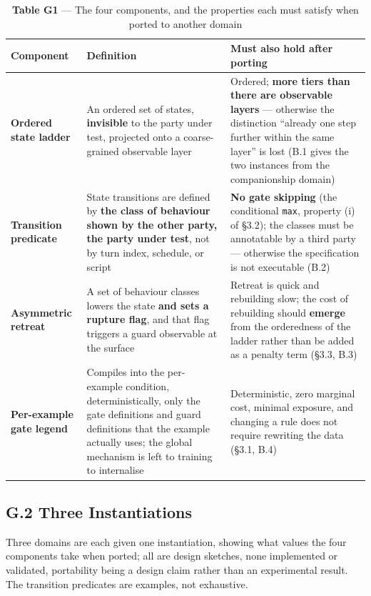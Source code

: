 \documentclass[letterpaper]{article}
\begin{document}
\begin{table}[t]
\centering\footnotesize
\setlength{\tabcolsep}{4pt}
\caption{\textbf{Table G1} --- The four components, and the properties each must satisfy when ported to another domain}
\begin{tabular}{@{}>{\raggedright\arraybackslash}p{}>{\raggedright\arraybackslash}p{}>{\raggedright\arraybackslash}p{}@{}}
\toprule
Component & Definition & Must also hold after porting \\
\midrule
\textbf{Ordered state ladder} & An ordered set of states, \textbf{invisible} to the party under test, projected onto a coarse-grained observable layer & Ordered; \textbf{more tiers than there are observable layers} --- otherwise the distinction ``already one step further within the same layer'' is lost (B.1 gives the two instances from the companionship domain) \\
\textbf{Transition predicate} & State transitions are defined by \textbf{the class of behaviour shown by the other party, the party under test}, not by turn index, schedule, or script & \textbf{No gate skipping} (the conditional \texttt{max}, property (i) of \S{}3.2); the classes must be annotatable by a third party --- otherwise the specification is not executable (B.2) \\
\textbf{Asymmetric retreat} & A set of behaviour classes lowers the state \textbf{and sets a rupture flag}, and that flag triggers a guard observable at the surface & Retreat is quick and rebuilding slow; the cost of rebuilding should \textbf{emerge} from the orderedness of the ladder rather than be added as a penalty term (\S{}3.3, B.3) \\
\textbf{Per-example gate legend} & Compiles into the per-example condition, deterministically, only the gate definitions and guard definitions that the example actually uses; the global mechanism is left to training to internalise & Deterministic, zero marginal cost, minimal exposure, and changing a rule does not require rewriting the data (\S{}3.1, B.4) \\
\bottomrule
\end{tabular}
\end{table}


\subsection*{G.2 Three Instantiations}

Three domains are each given one instantiation, showing what values the four components take when ported; all are design sketches, none implemented or validated, portability being a design claim rather than an experimental result. The transition predicates are examples, not exhaustive.
\end{document}
